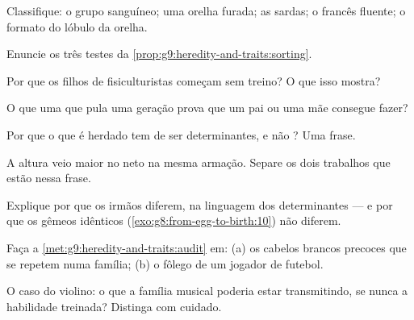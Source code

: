 \begin{exercise}[$\star$]\label{exo:g9:heredity-and-traits:2}
Classifique: o grupo sanguíneo; uma orelha furada; as
sardas; o francês fluente; o formato do lóbulo da orelha.
\end{exercise}

\begin{exercise}[$\star$]\label{exo:g9:heredity-and-traits:3}
Enuncie os três testes da
\cref{prop:g9:heredity-and-traits:sorting}.
\end{exercise}

\begin{exercise}[$\star$]\label{exo:g9:heredity-and-traits:4}
Por que os filhos de fisiculturistas começam sem treino? O
que isso mostra?
\end{exercise}

\begin{exercise}[$\star$]\label{exo:g9:heredity-and-traits:5}
O que uma  que pula uma geração prova que um
pai ou uma mãe consegue fazer?
\end{exercise}

\begin{exercise}[$\star$]\label{exo:g9:heredity-and-traits:6}
Por que o que é herdado tem de ser determinantes, e não
? Uma frase.
\end{exercise}

\begin{exercise}[$\star\star$]\label{exo:g9:heredity-and-traits:7}
A altura veio maior no neto na mesma armação. Separe os dois
trabalhos que estão nessa frase.
\end{exercise}

\begin{exercise}[$\star\star$]\label{exo:g9:heredity-and-traits:8}
Explique por que os irmãos diferem, na linguagem dos
determinantes --- e por que os gêmeos idênticos
(\cref{exo:g8:from-egg-to-birth:10}) não diferem.
\end{exercise}

\begin{exercise}[$\star\star$]\label{exo:g9:heredity-and-traits:9}
Faça a \cref{met:g9:heredity-and-traits:audit} em: (a) os
cabelos brancos precoces que se repetem numa família; (b) o
fôlego de um jogador de futebol.
\end{exercise}

\begin{exercise}[$\star\star$]\label{exo:g9:heredity-and-traits:10}
O caso do violino: o que a família musical poderia estar
transmitindo, se nunca a habilidade treinada? Distinga com
cuidado.
\end{exercise}

